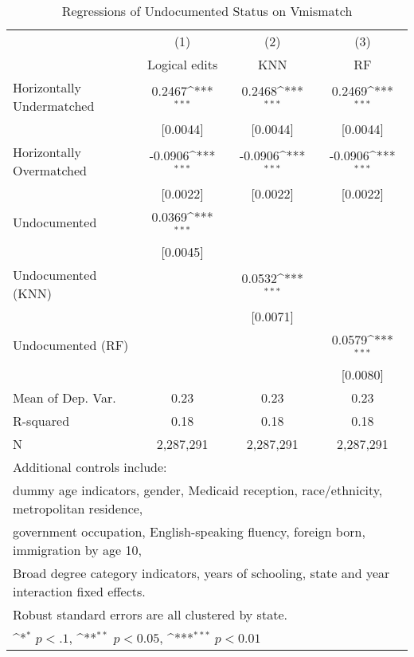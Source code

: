 \begin{table}[htbp]\centering
\def\sym#1{\ifmmode^{#1}\else\(^{#1}\)\fi}
\caption{Regressions of Undocumented Status on Vmismatch}
\begin{tabular}{l*{3}{c}}
\toprule
                    &\multicolumn{1}{c}{(1)}         &\multicolumn{1}{c}{(2)}         &\multicolumn{1}{c}{(3)}         \\
                    &Logical edits         &         KNN         &          RF         \\
\midrule
Horizontally Undermatched&      0.2467\sym{***}&      0.2468\sym{***}&      0.2469\sym{***}\\
                    &    [0.0044]         &    [0.0044]         &    [0.0044]         \\
\addlinespace
Horizontally Overmatched&     -0.0906\sym{***}&     -0.0906\sym{***}&     -0.0906\sym{***}\\
                    &    [0.0022]         &    [0.0022]         &    [0.0022]         \\
\addlinespace
Undocumented        &      0.0369\sym{***}&                     &                     \\
                    &    [0.0045]         &                     &                     \\
\addlinespace
Undocumented (KNN)  &                     &      0.0532\sym{***}&                     \\
                    &                     &    [0.0071]         &                     \\
\addlinespace
Undocumented (RF)   &                     &                     &      0.0579\sym{***}\\
                    &                     &                     &    [0.0080]         \\
\midrule
Mean of Dep. Var.   &        0.23         &        0.23         &        0.23         \\
R-squared           &        0.18         &        0.18         &        0.18         \\
N                   &   2,287,291         &   2,287,291         &   2,287,291         \\
\bottomrule
\multicolumn{4}{l}{\footnotesize Additional controls include:}\\
\multicolumn{4}{l}{\footnotesize dummy age indicators, gender, Medicaid reception, race/ethnicity, metropolitan residence,}\\
\multicolumn{4}{l}{\footnotesize government occupation, English-speaking fluency, foreign born, immigration by age 10,}\\
\multicolumn{4}{l}{\footnotesize Broad degree category indicators, years of schooling, state and year interaction fixed effects.}\\
\multicolumn{4}{l}{\footnotesize Robust standard errors are all clustered by state.}\\
\multicolumn{4}{l}{\footnotesize \sym{*} \(p<.1\), \sym{**} \(p<0.05\), \sym{***} \(p<0.01\)}\\
\end{tabular}
\end{table}
